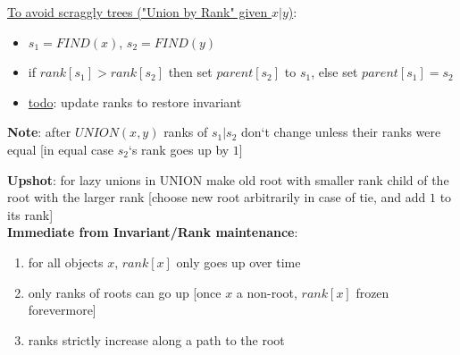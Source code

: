 \documentclass[a4paper,12pt]{article}
\theoremstyle{plain}
\theoremstyle{definition}
\theoremstyle{remark}
\begin{document}
\underline{To avoid scraggly trees ("Union by Rank" given $x | y$)}:
\begin{itemize}
	\item $s_1 = FIND(x)$, $s_2 = FIND(y)$
	\item if $rank[s_1] > rank[s_2]$ then set $parent[s_2]$ to $s_1$, else set $parent[s_1] = s_2$
	\item \underline{todo}: update ranks to restore invariant
\end{itemize}

\textbf{Note}: after $UNION(x, y)$ ranks of $s_1 | s_2$ don`t change unless their ranks were equal [in equal case $s_2$`s rank goes up by $1$]


\textbf{Upshot}: for lazy unions in UNION make old root with smaller rank child of the root with the larger rank [choose new root arbitrarily in case of tie, and add $1$ to its rank]
\\

\textbf{Immediate from Invariant/Rank maintenance}:
\begin{enumerate}
	\item for all objects $x$, $rank[x]$ only goes up over time
	\item only ranks of roots can go up [once $x$ a non-root, $rank[x]$ frozen forevermore]
	\item ranks strictly increase along a path to the root
\end{enumerate}
\end{document}
